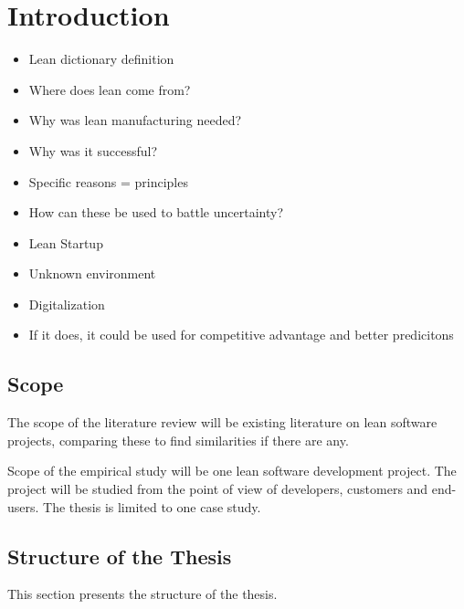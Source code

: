 

\chapter{Introduction}
\label{chapter:intro}


\begin{itemize}
  \item{Lean dictionary definition}
  \item{Where does lean come from?}
  \item{Why was lean manufacturing needed?}
  \item{Why was it successful?}
  \item{Specific reasons = principles}
  \item{How can these be used to battle uncertainty?}
  \item{Lean Startup}
  \item{Unknown environment}
  \item{Digitalization}
  \item{If it does, it could be used for competitive advantage and better predicitons}
\end{itemize}


\cite{2014PhDT82H} \cite{Janes2015Guide} \cite{boes2014agile}

\section{Scope}
\label{section:scope}

The scope of the literature review will be existing literature on lean software projects, comparing these to find similarities if there are any.

Scope of the empirical study will be one lean software development project. The project will be studied from the point of view of developers, customers and end-users. The thesis is limited to one case study.

\section{Structure of the Thesis}
\label{section:structure}

This section presents the structure of the thesis.\\


